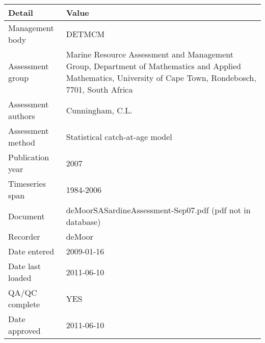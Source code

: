 \begin{table}[htb]
\centering
\begin{tabular}{lp{7cm}}
\toprule
Detail & Value \\
\midrule
Management body    & DETMCM                                                                                                                                                      \\
Assessment group   & Marine Resource Assessment and Management Group, Department of Mathematics and Applied Mathematics, University of Cape Town, Rondebosch, 7701, South Africa \\
Assessment authors & Cunningham, C.L.                                                                                                                                            \\
Assessment method  & Statistical catch-at-age model                                                                                                                              \\
Publication year   & 2007                                                                                                                                                        \\
Timeseries span    & 1984-2006                                                                                                                                                   \\
Document           & deMoorSASardineAssessment-Sep07.pdf (pdf not in database)                                                                                                   \\
Recorder           & deMoor                                                                                                                                                      \\
Date entered       & 2009-01-16                                                                                                                                                  \\
Date last loaded   & 2011-06-10                                                                                                                                                  \\
QA/QC complete     & YES                                                                                                                                                         \\
Date approved      & 2011-06-10                                                                                                                                                  \\
\bottomrule
\end{tabular}
\label{tab:assessdet}
\end{table}
